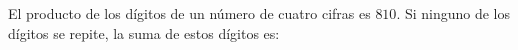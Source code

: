 El producto de los dígitos de un número de cuatro cifras es $810$. Si ninguno de los dígitos se repite, la suma de estos dígitos es: